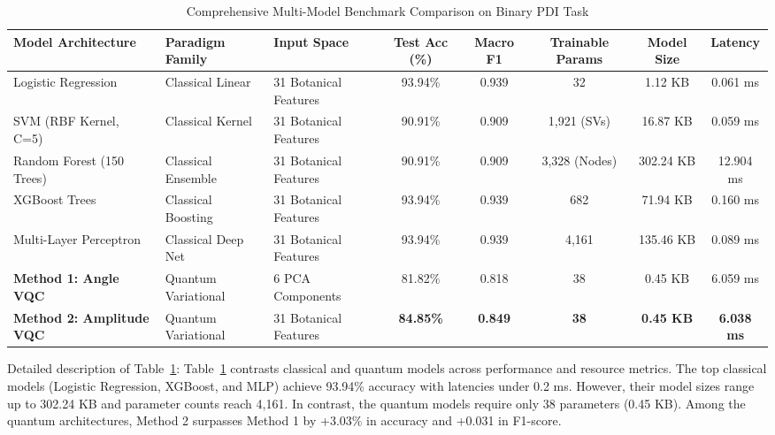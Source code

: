 \documentclass{ieeeaccess}
\begin{document}
\begin{table}[!t]
\caption{Comprehensive Multi-Model Benchmark Comparison on Binary PDI Task}
\label{tab:multi_model_benchmark}
\centering
\begin{tabular*}{\textwidth}{@{\extracolsep{\fill}}lllccccc@{}}
\toprule
\textbf{Model Architecture} & \textbf{Paradigm Family} & \textbf{Input Space} & \textbf{Test Acc (\%)} & \textbf{Macro F1} & \textbf{Trainable Params} & \textbf{Model Size} & \textbf{Latency} \\
\midrule
Logistic Regression         & Classical Linear         & 31 Botanical Features & 93.94\%                & 0.939             & 32                        & 1.12 KB             & 0.061 ms \\
SVM (RBF Kernel, C=5)       & Classical Kernel         & 31 Botanical Features & 90.91\%                & 0.909             & 1,921 (SVs)               & 16.87 KB            & 0.059 ms \\
Random Forest (150 Trees)   & Classical Ensemble       & 31 Botanical Features & 90.91\%                & 0.909             & 3,328 (Nodes)             & 302.24 KB           & 12.904 ms \\
XGBoost Trees               & Classical Boosting       & 31 Botanical Features & 93.94\%                & 0.939             & 682                       & 71.94 KB            & 0.160 ms \\
Multi-Layer Perceptron      & Classical Deep Net       & 31 Botanical Features & 93.94\%                & 0.939             & 4,161                     & 135.46 KB           & 0.089 ms \\
\midrule
\textbf{Method 1: Angle VQC}& Quantum Variational      & 6 PCA Components      & 81.82\%                & 0.818             & 38                        & 0.45 KB             & 6.059 ms \\
\textbf{Method 2: Amplitude VQC}& Quantum Variational  & 31 Botanical Features & \textbf{84.85\%}       & \textbf{0.849}    & \textbf{38}               & \textbf{0.45 KB}    & \textbf{6.038 ms} \\
\bottomrule
\end{tabular*}
\end{table}

Detailed description of Table~\ref{tab:multi_model_benchmark}: Table~\ref{tab:multi_model_benchmark} contrasts classical and quantum models across performance and resource metrics. The top classical models (Logistic Regression, XGBoost, and MLP) achieve 93.94\% accuracy with latencies under 0.2 ms. However, their model sizes range up to 302.24 KB and parameter counts reach 4,161. In contrast, the quantum models require only 38 parameters (0.45 KB). Among the quantum architectures, Method 2 surpasses Method 1 by +3.03\% in accuracy and +0.031 in F1-score.
\end{document}
